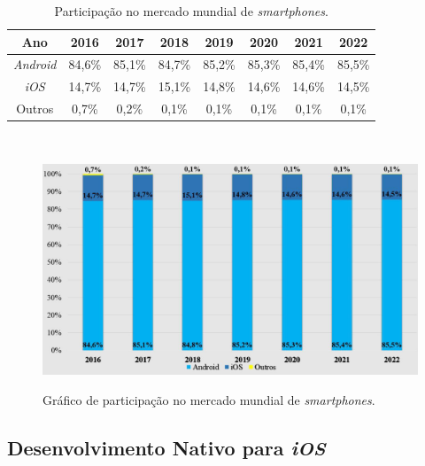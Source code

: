 \FloatBarrier
\begin{table}[!htbp]
\centering
\caption{Participação no mercado mundial de \textit{smartphones}.}
	\begin{tabular}{ c | c | c | c | c | c | c | c }
		\hline
		\textbf{Ano} & \textbf{2016} & \textbf{2017} & \textbf{2018} & \textbf{2019}  & \textbf{2020} & \textbf{2021} & \textbf{2022}  \\ \hline
		\textit{Android}      & 84,6\%        & 85,1\%        &  84,7\%       & 85,2\%         & 85,3\%        & 85,4\%        & 85,5\%  \\ \hline
		\textit{iOS}          & 14,7\%        & 14,7\%        & 15,1\%        & 14,8\%         &14,6\%         & 14,6\%        & 14,5\%     \\ \hline
		Outros       & 0,7\%         & 0,2\%         & 0,1\%         & 0,1\%          & 0,1\%         & 0,1\%         & 0,1\% \\ \hline
	\end{tabular}
	\\ \vspace{0.2cm}
	\label{tab:tabela1}
\end{table}
\FloatBarrier

\FloatBarrier
\begin{figure}[!htbp]
	\centering
		\caption{Gráfico de participação no mercado mundial de \textit{smartphones}.}
	\includegraphics[scale=0.4]{imagens/IDC}
	\label{fig:figura4}
\end{figure}
\FloatBarrier

\subsection{Desenvolvimento Nativo para \textit{iOS}}

